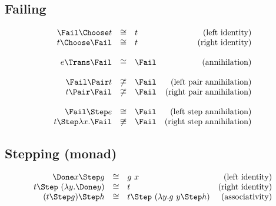 \subsection{Failing}

\begin{equation*}
  \begin{array}{rclr}
    \Fail \Choose t
      &\cong& t
      & \text{(left identity)} \\
    t \Choose \Fail
      &\cong& t
      & \text{(right identity)} \\
    & & & \\
    e \Trans \Fail
      &\cong& \Fail
      & \text{(annihilation)} \\
    & & & \\
    \Fail \Pair t
      &\not\cong& \Fail
      & \text{(left pair annihilation)} \\
    t \Pair \Fail
      &\not\cong& \Fail
      & \text{(right pair annihilation)} \\
    & & & \\
    \Fail \Step e
      &\cong& \Fail
      & \text{(left step annihilation)} \\
    t \Step \lambda x. \Fail
      &\not\cong& \Fail
      & \text{(right step annihilation)} \\
  \end{array}
\end{equation*}


\subsection{Stepping (monad)}

\begin{equation*}
  \begin{array}{rclr}
    \Done x \Step g
      &\cong& g\ x
      & \text{(left identity)} \\
    t \Step\ (\lambda y. \Done y)
      &\cong& t
      & \text{(right identity)} \\
    (t \Step g) \Step h
      &\cong& t \Step\ (\lambda y. g\ y \Step h)
      & \text{(associativity)}
  \end{array}
\end{equation*}
